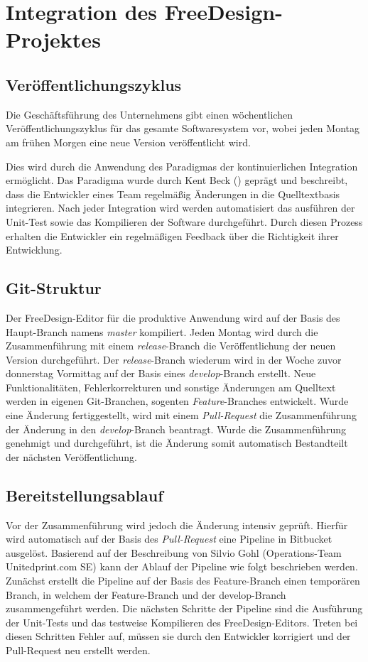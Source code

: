\section{Integration des FreeDesign-Projektes}

\subsection{Veröffentlichungszyklus}
Die Geschäftsführung des Unternehmens gibt einen wöchentlichen Veröffentlichungszyklus für das gesamte Softwaresystem vor, wobei jeden Montag am frühen Morgen eine neue Version veröffentlicht wird. 

Dies wird durch die Anwendung des Paradigmas der kontinuierlichen Integration ermöglicht. 
Das Paradigma wurde durch Kent Beck (\citeyear[59]{Beck2004}) geprägt und beschreibt, dass die Entwickler eines Team regelmäßig Änderungen in die Quelltextbasis integrieren. Nach jeder Integration wird werden automatisiert das ausführen der Unit-Test sowie das Kompilieren der Software durchgeführt. Durch diesen Prozess erhalten die Entwickler ein regelmäßigen Feedback über die Richtigkeit ihrer Entwicklung.

\subsection{Git-Struktur}
Der FreeDesign-Editor für die produktive Anwendung wird auf der Basis des Haupt-Branch namens \emph{master} kompiliert. 
Jeden Montag wird durch die Zusammenführung mit einem \emph{release}-Branch die Veröffentlichung der neuen Version durchgeführt. 
Der \emph{release}-Branch wiederum wird in der Woche zuvor donnerstag Vormittag auf der Basis eines \emph{develop}-Branch erstellt. Neue Funktionalitäten, Fehlerkorrekturen und sonstige Änderungen am Quelltext werden in eigenen Git-Branchen, sogenten \emph{Feature}-Branches entwickelt. Wurde eine Änderung fertiggestellt, wird mit einem \emph{Pull-Request} die Zusammenführung der Änderung in den \emph{develop}-Branch beantragt.
Wurde die Zusammenführung genehmigt und durchgeführt, ist die Änderung somit automatisch Bestandteilt der nächsten Veröffentlichung. 


\subsection{Bereitstellungsablauf}
Vor der Zusammenführung wird jedoch die Änderung intensiv geprüft. Hierfür wird automatisch auf der Basis des \emph{Pull-Request}
eine Pipeline in Bitbucket ausgelöst. 
Basierend auf der Beschreibung von Silvio Gohl (Operations-Team Unitedprint.com SE) kann der Ablauf der Pipeline wie folgt beschrieben werden.
Zunächst erstellt die Pipeline auf der Basis des Feature-Branch einen temporären Branch, in welchem der Feature-Branch und der develop-Branch zusammengeführt werden. 
Die nächsten Schritte der Pipeline sind die Ausführung der Unit-Tests und das testweise Kompilieren des FreeDesign-Editors. Treten bei diesen Schritten Fehler auf, müssen sie durch den Entwickler korrigiert und der Pull-Request neu erstellt werden. 

